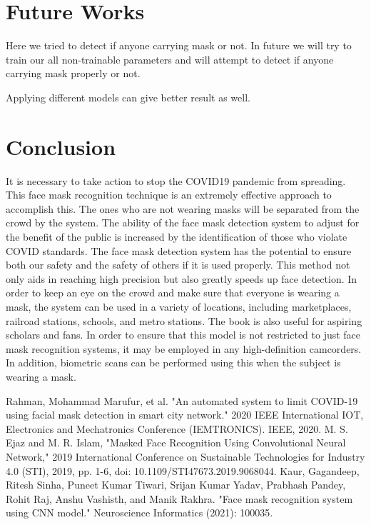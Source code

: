 \documentclass[conference]{IEEEtran}
\begin{document}
\section{Future Works}
Here we tried to detect if anyone carrying mask or not. In future we will try to train our all non-trainable parameters and will attempt to detect if anyone carrying mask properly or not.

Applying different models can give better result as well.

\section{Conclusion}
It is necessary to take action to stop the COVID19 pandemic from spreading. This face mask recognition technique is an extremely effective approach to accomplish this. The ones who are not wearing masks will be separated from the crowd by the system. The ability of the face mask detection system to adjust for the benefit of the public is increased by the identification of those who violate COVID standards. The face mask detection system has the potential to ensure both our safety and the safety of others if it is used properly. This method not only aids in reaching high precision but also greatly speeds up face detection. In order to keep an eye on the crowd and make sure that everyone is wearing a mask, the system can be used in a variety of locations, including marketplaces, railroad stations, schools, and metro stations. The book is also useful for aspiring scholars and fans. In order to ensure that this model is not restricted to just face mask recognition systems, it may be employed in any high-definition camcorders. In addition, biometric scans can be performed using this when the subject is wearing a mask.
\newline
\newline
\newline
\begin{thebibliography}{00}
 Rahman, Mohammad Marufur, et al. "An automated system to limit COVID-19 using facial mask detection in smart city network." 2020 IEEE International IOT, Electronics and Mechatronics Conference (IEMTRONICS). IEEE, 2020.
 M. S. Ejaz and M. R. Islam, "Masked Face Recognition Using Convolutional Neural Network," 2019 International Conference on Sustainable Technologies for Industry 4.0 (STI), 2019, pp. 1-6, doi: 10.1109/STI47673.2019.9068044.
 Kaur, Gagandeep, Ritesh Sinha, Puneet Kumar Tiwari, Srijan Kumar Yadav, Prabhash Pandey, Rohit Raj, Anshu Vashisth, and Manik Rakhra. "Face mask recognition system using CNN model." Neuroscience Informatics (2021): 100035.
\end{thebibliography}
\end{document}

